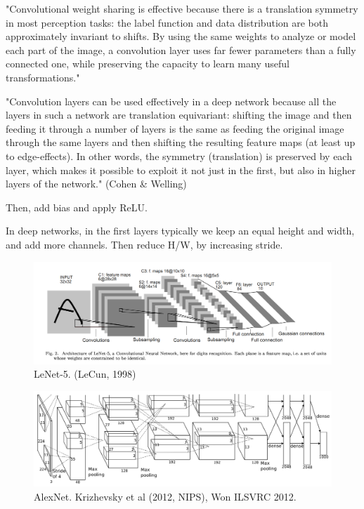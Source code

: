 \documentclass[english]{article}
\begin{document}
"Convolutional weight sharing is effective because there is a translation symmetry in most perception tasks: the label function and data distribution are both approximately
invariant to shifts.  By using the same weights to analyze
or model each part of the image, a convolution layer uses
far fewer parameters than a fully connected one, while preserving the capacity to learn many useful transformations."

"Convolution layers can be used effectively in a deep network because all the layers in such a network are translation equivariant: shifting the image and then feeding
it through a number of layers is the same as feeding the
original image through the same layers and then shifting
the resulting feature maps (at least up to edge-effects). In
other words, the symmetry (translation) is preserved by
each layer, which makes it possible to exploit it not just
in the first, but also in higher layers of the network." (Cohen \& Welling)


\item Then, add bias and apply ReLU. 
 
In deep networks, in the first layers typically we keep an equal height and width, and add more channels. Then reduce H/W, by increasing stride. %

\begin{figure}
  \centering
  \includegraphics[scale=0.3]{lenet.png}
  \caption{LeNet-5. (LeCun, 1998)}
  \label{lenet5}
\end{figure}


\begin{figure}
  \centering
  \includegraphics[scale=0.75]{a.png}
  \caption{AlexNet. Krizhevsky et al (2012, NIPS), Won ILSVRC 2012.}
  \label{AlexNet}
\end{figure}
\end{document}
